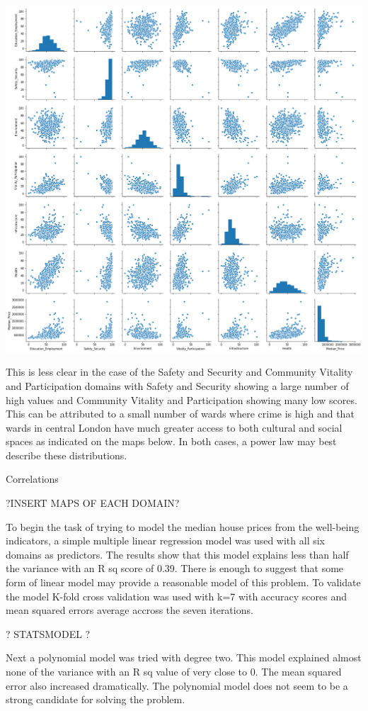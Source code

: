 \includegraphics[scale=0.3]{figures/pairplot} %

This is less clear in the case of the Safety and Security and Community Vitality and Participation domains with Safety and Security showing a large number of high values and Community Vitality and Participation showing many low scores. This can be attributed to a small number of wards where crime is high and that wards in central London have much greater access to both cultural and social spaces as indicated on the maps below. In both cases, a power law may best describe these distributions.

Correlations

?INSERT MAPS OF EACH DOMAIN?

To begin the task of trying to model the median house prices from the well-being indicators, a simple multiple linear regression model was used with all six domains as predictors. The results show that this model explains less than half the variance with an R sq score of 0.39. There is enough to suggest that some form of linear model may provide a reasonable model of this problem.
To validate the model K-fold cross validation was used with k=7 with accuracy scores and mean squared errors average accross the seven iterations.

? STATSMODEL ?

Next a polynomial model was tried with degree two. This model explained almost none of the variance with an R sq value of very close to 0. The mean squared error also increased dramatically. The polynomial model does not seem to be a strong candidate for solving the problem.

